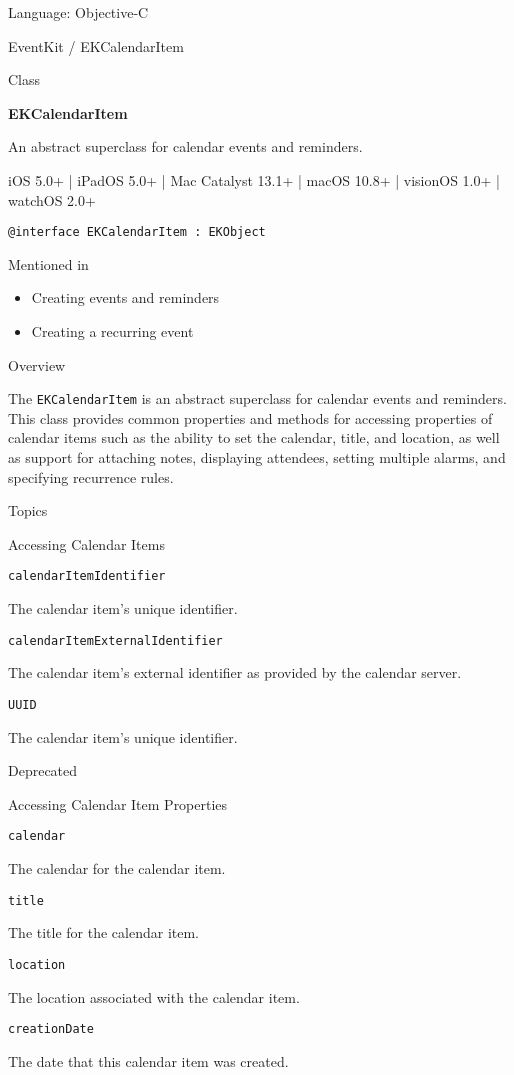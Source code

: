 \documentclass{article}
\title{}
\author{}
\date{}
\begin{document}
Language: Objective-C

EventKit / EKCalendarItem

Class

\textbf{EKCalendarItem}

An abstract superclass for calendar events and reminders.

iOS 5.0+ | iPadOS 5.0+ | Mac Catalyst 13.1+ | macOS 10.8+ | visionOS 1.0+ | watchOS 2.0+

\texttt{@interface EKCalendarItem : EKObject}

Mentioned in
\begin{itemize}
    \item Creating events and reminders
    \item Creating a recurring event
\end{itemize}

Overview

The \texttt{EKCalendarItem} is an abstract superclass for calendar events and reminders. This class provides common properties and methods for accessing properties of calendar items such as the ability to set the calendar, title, and location, as well as support for attaching notes, displaying attendees, setting multiple alarms, and specifying recurrence rules.

Topics

Accessing Calendar Items

\texttt{calendarItemIdentifier}

The calendar item's unique identifier.

\texttt{calendarItemExternalIdentifier}

The calendar item's external identifier as provided by the calendar server.

\texttt{UUID}

The calendar item's unique identifier.

Deprecated

Accessing Calendar Item Properties

\texttt{calendar}

The calendar for the calendar item.

\texttt{title}

The title for the calendar item.

\texttt{location}

The location associated with the calendar item.

\texttt{creationDate}

The date that this calendar item was created.
\end{document}
